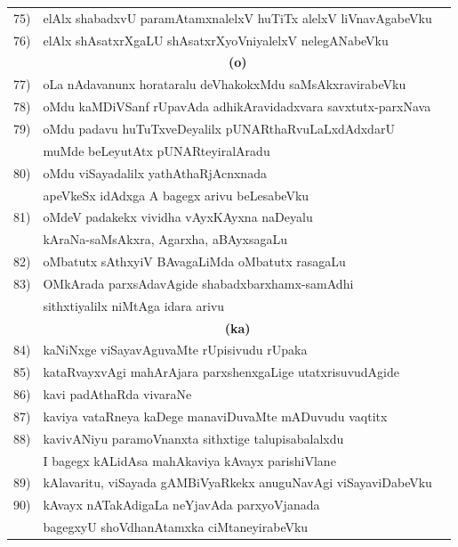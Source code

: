 \begin{longtable}{@{}cp{7.4cm}r}
75) & elAlx shabadxvU paramAtamxnalelxV huTiTx alelxV liVnavAgabeVku & \pageref{page182a}\\
76) & elAlx shAsatxrXgaLU shAsatxrXyoVniyalelxV nelegANabeVku & \pageref{page179}\\[0.3cm]  
    &  \multicolumn{1}{c}{\bf(o)} & \\[0.3cm]  
77) & oLa nAdavanunx horataralu deVhakokxMdu saMsAkxravirabeVku &  \pageref{page130}\\
78) & oMdu kaMDiVSanf rUpavAda adhikAravidadxvara savxtutx-parxNava & \pageref{page140a}\\
79) & oMdu padavu huTuTxveDeyalilx pUNARthaRvuLaLxdAdxdarU  & \\ 
    & muMde beLeyutAtx pUNARteyiralAradu &  \pageref{page177a}\\
80) & oMdu viSayadalilx yathAthaRjAcnxnada  & \\
    & apeVkeSx idAdxga A bagegx arivu beLesabeVku &  \pageref{page200}\\
81) & oMdeV padakekx vividha vAyxKAyxna naDeyalu  & \\
    & kAraNa-saMsAkxra, Agarxha, aBAyxsagaLu  & \pageref{page212a}\\ 
82) & oMbatutx sAthxyiV BAvagaLiMda oMbatutx rasagaLu & \pageref{page230b}\\ 
83) & OMkArada parxsAdavAgide shabadxbarxhamx-samAdhi & \\
    & sithxtiyalilx niMtAga idara arivu & \pageref{page203}\\
    &  \multicolumn{1}{c}{\bf(ka)} & \\[0.3cm]
84) & kaNiNxge viSayavAguvaMte rUpisivudu rUpaka & \pageref{page241}\\
85) & kataRvayxvAgi mahArAjara parxshenxgaLige utatxrisuvudAgide & \pageref{page250}\\
86)  & kavi padAthaRda vivaraNe & \pageref{page184}\\
87) & kaviya vataRneya kaDege manaviDuvaMte mADuvudu vaqtitx & \pageref{page245a}\\
88) & kavivANiyu paramoVnanxta sithxtige talupisabalalxdu & \\
    & I bagegx kALidAsa mahAkaviya kAvayx parishiVlane & \pageref{page232}\\    
89) & kAlavaritu, viSayada gAMBiVyaRkekx anuguNavAgi viSayaviDabeVku & \pageref{page250a}\\
90) & kAvayx nATakAdigaLa neYjavAda parxyoVjanada   & \\
    & bagegxyU shoVdhanAtamxka ciMtaneyirabeVku & \pageref{page233} \\

\end{longtable}
